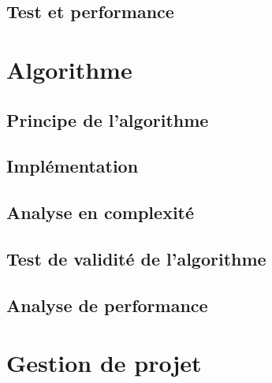 \documentclass[french,a4paper]{article}
\begin{document}
\subsubsection{}
\subsubsection{}
\subsubsection{}
\subsection{Test et performance}
\subsubsection{}
\subsubsection{}
\subsubsection{}

\newpage
\section{Algorithme}
\subsection{Principe de l'algorithme}
\subsection{Implémentation}
\subsection{Analyse en complexité}
\subsection{Test de validité de l'algorithme}
\subsection{Analyse de performance}

\newpage
\section{Gestion de projet}
\end{document}
